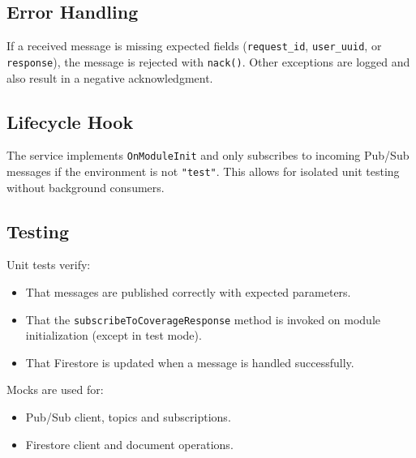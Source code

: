 \subsection*{Error Handling}

If a received message is missing expected fields (\texttt{request\_id}, \texttt{user\_uuid}, or \texttt{response}), the message is rejected with \texttt{nack()}. Other exceptions are logged and also result in a negative acknowledgment.

\subsection*{Lifecycle Hook}

The service implements \texttt{OnModuleInit} and only subscribes to incoming Pub/Sub messages if the environment is not \texttt{"test"}. This allows for isolated unit testing without background consumers.

\subsection*{Testing}

Unit tests verify:
\begin{itemize}
    \item That messages are published correctly with expected parameters.
    \item That the \texttt{subscribeToCoverageResponse} method is invoked on module initialization (except in test mode).
    \item That Firestore is updated when a message is handled successfully.
\end{itemize}

Mocks are used for:
\begin{itemize}
    \item Pub/Sub client, topics and subscriptions.
    \item Firestore client and document operations.
\end{itemize}
